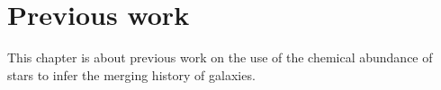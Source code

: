 \chapter{Previous work}

This chapter is about previous work on the use of the chemical abundance of stars to infer the merging history of galaxies.
